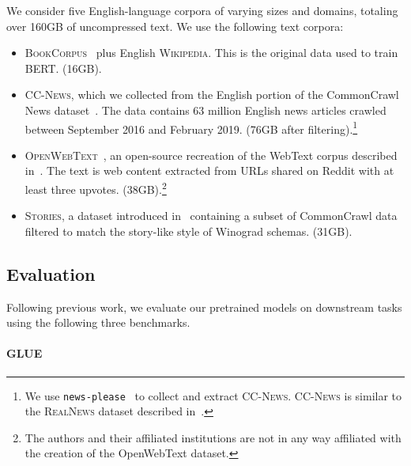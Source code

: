 We consider five English-language corpora of varying sizes and domains, totaling over 160GB of uncompressed text. We use the following text corpora:
\begin{itemize}[leftmargin=*]
\setlength\itemsep{0em}
\item \textsc{BookCorpus}~\cite{moviebook} plus English \textsc{Wikipedia}. This is the original data used to train BERT. (16GB).
\item \textsc{CC-News}, which we collected from the English portion of the CommonCrawl News dataset~\cite{nagel2016ccnews}. The data contains 63 million English news articles crawled between September 2016 and February 2019. (76GB after filtering).\footnote{We use \texttt{news-please}~\cite{hamborg2017newsplease} to collect and extract \textsc{CC-News}. \textsc{CC-News} is similar to the \textsc{RealNews} dataset described in~.}
\item \textsc{OpenWebText}~\cite{gokaslan2019openwebtext}, an open-source recreation of the WebText corpus described in~. The text is web content extracted from URLs shared on Reddit with at least three upvotes. (38GB).\footnote{The authors and their affiliated institutions are not in any way affiliated with the creation of the OpenWebText dataset.}
\item \textsc{Stories}, a dataset introduced in~ containing a subset of CommonCrawl data filtered to match the story-like style of Winograd schemas. (31GB).
\end{itemize}





\subsection{Evaluation} \label{sec:evaluation}

Following previous work, we evaluate our pretrained models on downstream tasks using the following three benchmarks.

\paragraph{GLUE} \label{sec:glue}

